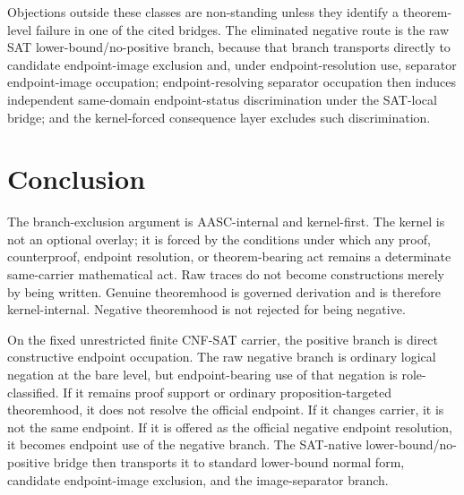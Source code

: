 \documentclass[11pt]{article}
\theoremstyle{definition}
\theoremstyle{remark}
\begin{document}
Objections outside these classes are non-standing unless they identify a theorem-level failure in one of the cited bridges. The eliminated negative route is the raw SAT lower-bound/no-positive branch, because that branch transports directly to candidate endpoint-image exclusion and, under endpoint-resolution use, separator endpoint-image occupation; endpoint-resolving separator occupation then induces independent same-domain endpoint-status discrimination under the SAT-local bridge; and the kernel-forced consequence layer excludes such discrimination.


\section{Conclusion}
The branch-exclusion argument is AASC-internal and kernel-first. The kernel is not an optional overlay; it is forced by the conditions under which any proof, counterproof, endpoint resolution, or theorem-bearing act remains a determinate same-carrier mathematical act. Raw traces do not become constructions merely by being written. Genuine theoremhood is governed derivation and is therefore kernel-internal. Negative theoremhood is not rejected for being negative.

On the fixed unrestricted finite CNF-SAT carrier, the positive branch is direct constructive endpoint occupation. The raw negative branch is ordinary logical negation at the bare level, but endpoint-bearing use of that negation is role-classified. If it remains proof support or ordinary proposition-targeted theoremhood, it does not resolve the official endpoint. If it changes carrier, it is not the same endpoint. If it is offered as the official negative endpoint resolution, it becomes endpoint use of the negative branch. The SAT-native lower-bound/no-positive bridge then transports it to standard lower-bound normal form, candidate endpoint-image exclusion, and the image-separator branch.
\end{document}
